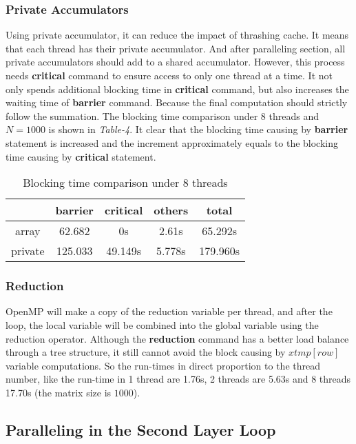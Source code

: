 \documentclass[10pt, a4paper]{article}
\begin{document}
	\subsubsection{Private Accumulators}
	
    Using private accumulator, it can reduce the impact of thrashing cache. It means that each thread has their private accumulator. And after paralleling section, all private accumulators should add to a shared accumulator. However, this process needs \textbf{critical} command to ensure access to only one thread at a time. It not only spends additional blocking time in \textbf{critical} command, but also increases the waiting time of \textbf{barrier} command. Because the final computation should strictly follow the summation. The blocking time comparison under $8$ threads and $N=1000$ is shown in \textit{Table-4}. It clear that the blocking time causing by \textbf{barrier} statement is increased and the increment approximately equals to the blocking time causing by \textbf{critical} statement.
	
	\begin{table}[h!]
    \centering
    \begin{tabular}{ |c|c|c|c|c| } 
     \hline
     & barrier & critical & others & total \\ \hline
    array & 62.682 & 0s & 2.61s & 65.292s \\ \hline
    private & 125.033 & 49.149s & 5.778s & 179.960s \\ \hline
    \end{tabular}
    \caption{Blocking time comparison under 8 threads}
    \end{table}
	
	\subsubsection{Reduction}
	
    OpenMP will make a copy of the reduction variable per thread, and after the loop, the local variable will be combined into the global variable using the reduction operator. Although the \textbf{reduction} command has a better load balance through a tree structure, it still cannot avoid the block causing by $xtmp[row]$ variable computations. So the run-times in direct proportion to the thread number, like the run-time in 1 thread are 1.76s, 2 threads are 5.63s and 8 threads  17.70s (the matrix size is $1000$).

    
	\subsection{Paralleling in the Second Layer Loop}
	
\end{document}
